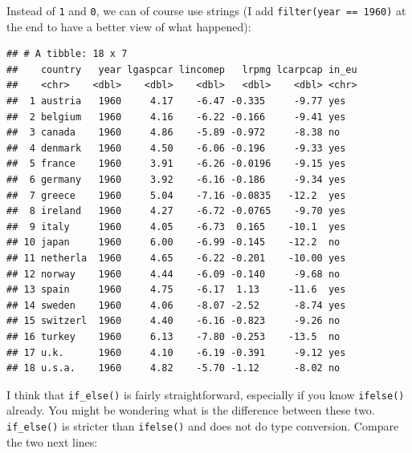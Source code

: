 \documentclass[]{gitbook}
\newenvironment{Shaded}{\begin{snugshade}}{\end{snugshade}}
\newcommand{\DataTypeTok}[1]{\textcolor[rgb]{0.13,0.29,0.53}{#1}}
\newcommand{\DecValTok}[1]{\textcolor[rgb]{0.00,0.00,0.81}{#1}}
\newcommand{\KeywordTok}[1]{\textcolor[rgb]{0.13,0.29,0.53}{\textbf{#1}}}
\newcommand{\NormalTok}[1]{#1}
\newcommand{\OperatorTok}[1]{\textcolor[rgb]{0.81,0.36,0.00}{\textbf{#1}}}
\newcommand{\StringTok}[1]{\textcolor[rgb]{0.31,0.60,0.02}{#1}}
\theoremstyle{definition}
\theoremstyle{definition}
\theoremstyle{definition}
\theoremstyle{remark}
\begin{document}
Instead of \texttt{1} and \texttt{0}, we can of course use strings (I
add \texttt{filter(year\ ==\ 1960)} at the end to have a better view of
what happened):

\begin{Shaded}
\end{Shaded}

\begin{verbatim}
## # A tibble: 18 x 7
##    country   year lgaspcar lincomep   lrpmg lcarpcap in_eu
##    <chr>    <dbl>    <dbl>    <dbl>   <dbl>    <dbl> <chr>
##  1 austria   1960     4.17    -6.47 -0.335     -9.77 yes  
##  2 belgium   1960     4.16    -6.22 -0.166     -9.41 yes  
##  3 canada    1960     4.86    -5.89 -0.972     -8.38 no   
##  4 denmark   1960     4.50    -6.06 -0.196     -9.33 yes  
##  5 france    1960     3.91    -6.26 -0.0196    -9.15 yes  
##  6 germany   1960     3.92    -6.16 -0.186     -9.34 yes  
##  7 greece    1960     5.04    -7.16 -0.0835   -12.2  yes  
##  8 ireland   1960     4.27    -6.72 -0.0765    -9.70 yes  
##  9 italy     1960     4.05    -6.73  0.165    -10.1  yes  
## 10 japan     1960     6.00    -6.99 -0.145    -12.2  no   
## 11 netherla  1960     4.65    -6.22 -0.201    -10.00 yes  
## 12 norway    1960     4.44    -6.09 -0.140     -9.68 no   
## 13 spain     1960     4.75    -6.17  1.13     -11.6  yes  
## 14 sweden    1960     4.06    -8.07 -2.52      -8.74 yes  
## 15 switzerl  1960     4.40    -6.16 -0.823     -9.26 no   
## 16 turkey    1960     6.13    -7.80 -0.253    -13.5  no   
## 17 u.k.      1960     4.10    -6.19 -0.391     -9.12 yes  
## 18 u.s.a.    1960     4.82    -5.70 -1.12      -8.02 no
\end{verbatim}

I think that \texttt{if\_else()} is fairly straightforward, especially
if you know \texttt{ifelse()} already. You might be wondering what is
the difference between these two. \texttt{if\_else()} is stricter than
\texttt{ifelse()} and does not do type conversion. Compare the two next
lines:
\end{document}
